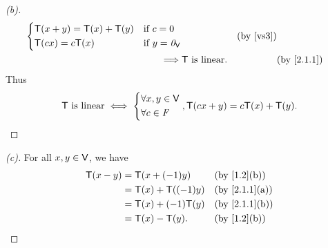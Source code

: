 \begin{proof}[(b)]
\begin{align*}
\begin{dcases}
                               \T(x + y) = \T(x) + \T(y) & \text{if } c = 0        \\
                               \T(cx) = c\T(x)           & \text{if } y = \zv_{\V}
                             \end{dcases}             &  & \text{(by \ref{vs3})}                  \\
    \implies & \T \text{ is linear}.                                              &  & \by{2.1.1}
  \end{align*}
  Thus
  \[
    \mathsf{T} \text{ is linear} \iff \begin{dcases}
      \forall x, y \in \mathsf{V} \\
      \forall c \in \mathit{F}
    \end{dcases}, \mathsf{T}(cx + y) = c\mathsf{T}(x) + \mathsf{T}(y).
  \]
\end{proof}

\begin{proof}[(c)]
  For all \(x, y \in \mathsf{V}\), we have
  \begin{align*}
    \T(x - y) & = \T(x + (-1)y)      &  & \by{1.2}[b]   \\
              & = \T(x) + \T((-1)y)  &  & \by{2.1.1}[a] \\
              & = \T(x) + (-1) \T(y) &  & \by{2.1.1}[b] \\
              & = \T(x) - \T(y).     &  & \by{1.2}[b]
  \end{align*}
\end{proof}

